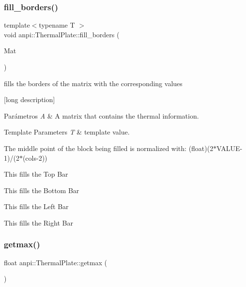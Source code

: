 \mbox{\label{classanpi_1_1ThermalPlate_aa971acba23c6ee4e136e095d719b2fe0}} 
\subsubsection{\texorpdfstring{fill\+\_\+borders()}{fill\_borders()}}
{\footnotesize\ttfamily template$<$typename T $>$ \\
void anpi\+::\+Thermal\+Plate\+::fill\+\_\+borders (\begin{DoxyParamCaption}\item[{\hyperlink{classanpi_1_1Matrix}{Matrix}$<$ T $>$ \&}]{Mat }\end{DoxyParamCaption})\hspace{0.3cm}{\ttfamily [inline]}}



fills the borders of the matrix with the corresponding values 

\mbox{[}long description\mbox{]}


\begin{DoxyParams}{Parámetros}
{\em A} & A matrix that contains the thermal information. \\
\hline
\end{DoxyParams}

\begin{DoxyTemplParams}{Template Parameters}
{\em T} & template value. \\
\hline
\end{DoxyTemplParams}
The middle point of the block being filled is normalized with\+: (float)(2$\ast$\+V\+A\+L\+U\+E-\/1)/(2$\ast$(cols-\/2))

This fills the Top Bar

This fills the Bottom Bar

This fills the Left Bar

This fills the Right Bar \mbox{\label{classanpi_1_1ThermalPlate_a13e2c721d18c3b0ee1d6cc4377dd563e}} 
\subsubsection{\texorpdfstring{getmax()}{getmax()}}
{\footnotesize\ttfamily float anpi\+::\+Thermal\+Plate\+::getmax (\begin{DoxyParamCaption}{ }\end{DoxyParamCaption})\hspace{0.3cm}{\ttfamily [inline]}}

